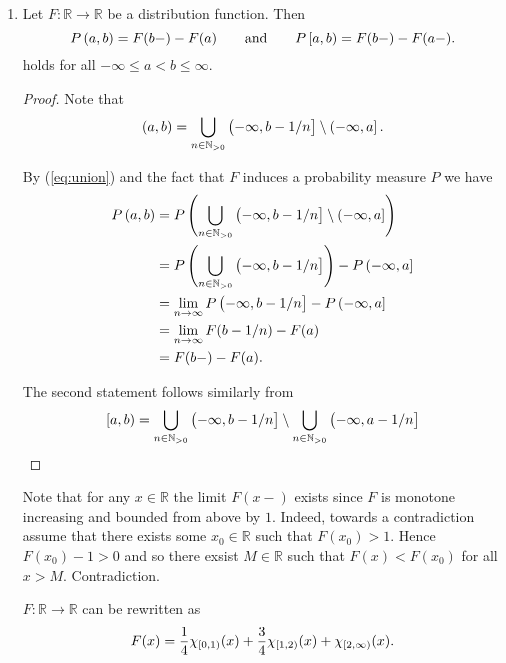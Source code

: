 \begin{enumerate}[label = \textbf{Exercise \arabic*.},wide = 0pt, itemsep=1.5ex]
	\item 
		\begin{lemma}
			Let $F: \mathbb{R} \to \mathbb{R}$ be a distribution function. Then
			\begin{equation}
				P\intoo{a,b} = F(b-) - F(a) \qquad \text{and} \qquad P\intco{a,b} = F(b- ) - F(a-).
			\end{equation}
			\noindent holds for all $-\infty \leq a < b \leq \infty$.
			\label{lem:3}
		\end{lemma}

		\begin{proof}
			Note that 
			\begin{equation}
				\intoo{a,b} = \bigcup_{n \in \mathbb{N}_{>0}} \intoc{-\infty,b - 1/n} \setminus \intoc{-\infty,a}.
				\label{eq:union}
			\end{equation}

			By (\ref{eq:union}) and the fact that $F$ induces a probability measure $P$ we have 
			\begin{align*}
				P\intoo{a,b} &= P\del[4]{\bigcup_{n \in \mathbb{N}_{>0}} \intoc{-\infty,b - 1/n} \setminus \intoc{-\infty,a}}\\
				&= P\del[4]{\bigcup_{n \in \mathbb{N}_{>0}} \intoc{-\infty,b - 1/n}} - P\intoc{-\infty,a}\\
				&= \lim_{n \to \infty} P\intoc{-\infty,b - 1/n} - P\intoc{-\infty,a}\\
				&= \lim_{n \to \infty} F(b - 1/n) - F(a)\\
				&= F(b-) - F(a).
			\end{align*}

			The second statement follows similarly from
			\begin{equation}
				\intco{a,b} = \bigcup_{n \in \mathbb{N}_{>0}} \intoc{-\infty,b - 1/n} \setminus \bigcup_{n \in \mathbb{N}_{>0}}\intoc{-\infty,a - 1/n}
			\end{equation}
		\end{proof}
		
		\begin{remark}
			Note that for any $x \in \mathbb{R}$ the limit $F(x-)$ exists since $F$ is monotone increasing and bounded from above by $1$. Indeed, towards a contradiction assume that there exists some $x_0 \in \mathbb{R}$ such that $F(x_0) > 1$. Hence $F(x_0) - 1 > 0$ and so there exsist $M \in \mathbb{R}$ such that $F(x) < F(x_0)$ for all $x > M$. Contradiction.
		\end{remark}
		$F: \mathbb{R} \to \mathbb{R}$ can be rewritten as 
		\begin{equation}
			F(x) = \frac{1}{4}\chi_{\intco{0,1}}(x) + \frac{3}{4}\chi_{\intco{1,2}}(x) + \chi_{\intco{2,\infty}}(x).
		\end{equation}
	

\end{enumerate}
